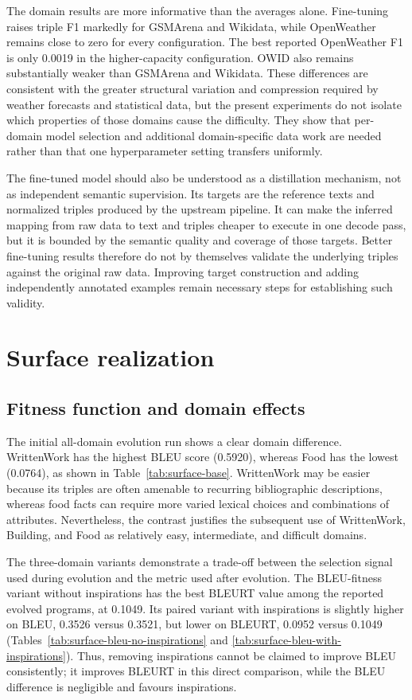The domain results are more informative than the averages alone. Fine-tuning
raises triple F1 markedly for GSMArena and Wikidata, while OpenWeather remains
close to zero for every configuration. The best reported OpenWeather F1 is only
0.0019 in the higher-capacity configuration. OWID also remains substantially
weaker than GSMArena and Wikidata. These differences are consistent with the
greater structural variation and compression required by weather forecasts and
statistical data, but the present experiments do not isolate which properties
of those domains cause the difficulty. They show that per-domain model
selection and additional domain-specific data work are needed rather than that
one hyperparameter setting transfers uniformly.

The fine-tuned model should also be understood as a distillation mechanism, not
as independent semantic supervision. Its targets are the reference texts and
normalized triples produced by the upstream pipeline. It can make the inferred
mapping from raw data to text and triples cheaper to execute in one decode pass,
but it is bounded by the semantic quality and coverage of those targets. Better
fine-tuning results therefore do not by themselves validate the underlying
triples against the original raw data. Improving target construction and adding
independently annotated examples remain necessary steps for establishing such
validity.

\section{Surface realization}

\subsection{Fitness function and domain effects}

The initial all-domain evolution run shows a clear domain difference. WrittenWork
has the highest BLEU score (0.5920), whereas Food has the lowest (0.0764), as
shown in Table~\ref{tab:surface-base}. WrittenWork may be easier because its
triples are often amenable to recurring bibliographic descriptions, whereas
food facts can require more varied lexical choices and combinations of
attributes. Nevertheless, the contrast justifies the subsequent
use of WrittenWork, Building, and Food as relatively easy, intermediate, and
difficult domains.

The three-domain variants demonstrate a trade-off between the selection signal
used during evolution and the metric used after evolution. The BLEU-fitness
variant without inspirations has the best BLEURT value among the reported
evolved programs, at 0.1049. Its paired variant with inspirations is slightly
higher on BLEU, 0.3526 versus 0.3521, but lower on BLEURT, 0.0952 versus 0.1049
(Tables~\ref{tab:surface-bleu-no-inspirations} and
\ref{tab:surface-bleu-with-inspirations}). Thus, removing inspirations cannot
be claimed to improve BLEU consistently; it improves BLEURT in this direct
comparison, while the BLEU difference is negligible and favours inspirations.

